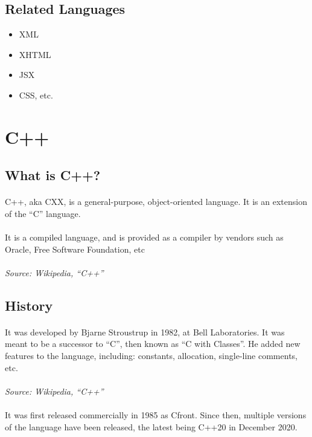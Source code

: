 \documentclass{article}
\begin{document}
\subsection*{Related Languages}
\begin{itemize}
	\item XML
	\item XHTML
	\item JSX
	\item CSS, etc.
\end{itemize}

\section*{C++}
\subsection*{What is C++?}
\paragraph{}C++, aka CXX, is a general-purpose, object-oriented language.
It is an extension of the “C” language.
\paragraph{}It is a compiled language, and is provided as a compiler by vendors such as Oracle, Free Software Foundation, etc
\paragraph{}\textit{Source: Wikipedia, “C++”}
\subsection*{History}
\paragraph{}It was developed by Bjarne Stroustrup in 1982, at Bell Laboratories. It was meant to be a successor to “C”, then known as “C with Classes”.
He added new features to the language, including: constants, allocation, single-line comments, etc.
\paragraph{}\textit{Source: Wikipedia, “C++”}
\paragraph{}It was first released commercially in 1985 as Cfront.
Since then, multiple versions of the language have been released, the latest being C++20 in December 2020.
\end{document}
